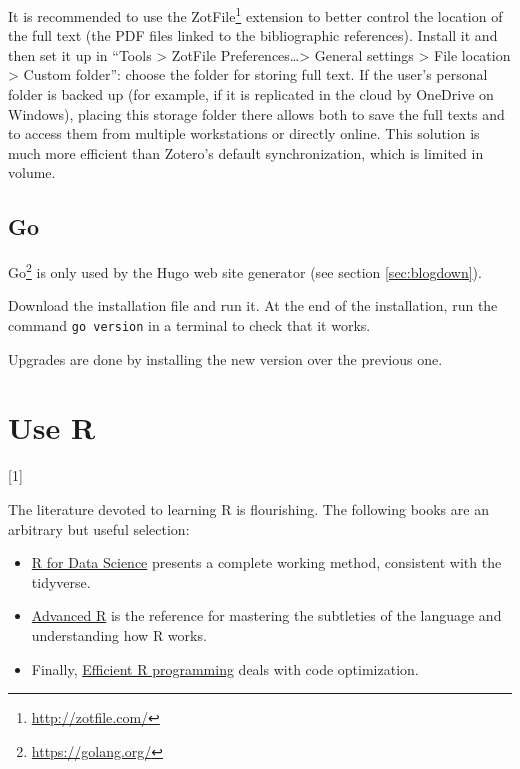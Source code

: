 \documentclass[
  12pt,
  american,
  a4paper,
  extrafontsizes,onecolumn,openright
  ]{memoir}
\providecommand{\tightlist}{%
  \setlength{\itemsep}{0pt}\setlength{\parskip}{0pt}}
\newcommand{\toc}[1]{%
  \startcontents[chapters]%
  \printcontents[chapters]{}{1}[#1]{}%
  ~\newline%
}
\begin{document}
It is recommended to use the ZotFile\footnote{\url{http://zotfile.com/}} extension to better control the location of the full text (the PDF files linked to the bibliographic references).
Install it and then set it up in \enquote{Tools \textgreater{} ZotFile Preferences\ldots\textgreater{} General settings \textgreater{} File location \textgreater{} Custom folder}: choose the folder for storing full text.
If the user's personal folder is backed up (for example, if it is replicated in the cloud by OneDrive on Windows), placing this storage folder there allows both to save the full texts and to access them from multiple workstations or directly online.
This solution is much more efficient than Zotero's default synchronization, which is limited in volume.

\hypertarget{go}{%
\section{Go}\label{go}}

Go\footnote{\url{https://golang.org/}} is only used by the Hugo web site generator (see section \ref{sec:blogdown}).

Download the installation file and run it.
At the end of the installation, run the command \texttt{go\ version} in a terminal to check that it works.

Upgrades are done by installing the new version over the previous one.

\hypertarget{chap-utiliseR}{%
\chapter{Use R}\label{chap-utiliseR}}

\toc{1}

The literature devoted to learning R is flourishing.
The following books are an arbitrary but useful selection:

\begin{itemize}
\tightlist
\item
  \href{https://r4ds.had.co.nz/}{R for Data Science} \autocite{Wickham2016} presents a complete working method, consistent with the tidyverse.
\item
  \href{http://adv-r.had.co.nz/}{Advanced R} \autocite{Wickham2014} is the reference for mastering the subtleties of the language and understanding how R works.
\item
  Finally, \href{https://csgillespie.github.io/efficientR/}{Efficient R programming} \autocite{Gillespie2016} deals with code optimization.
\end{itemize}
\end{document}
